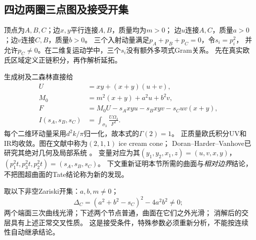 \documentclass[11pt,a4paper]{ctexart}
\theoremstyle{cnplain}\newtheorem{theorem}{定理}[section]
\theoremstyle{definition}\newtheorem{definition}[theorem]{定义}
\theoremstyle{remark}\newtheorem{remark}[theorem]{注}
\begin{document}
\subsection{四边两圈三点图及接受开集}
顶点为$A,B,C$；边$x,y$平行连接$A,B$，质量均为$m>0$；
边$u$连接$A,C$，质量$a>0$；边$v$连接$C,B$，质量$b>0$。
三个入射动量满足$p_A+p_B+p_C=0$，令$s_i=p_i^2$，
并允许$p_C\ne0$。在二维复运动学中，三个$s_i$没有额外多项式Gram关系。
先在真实欧氏区域定义正链积分，再作解析延拓。

生成树及二森林直接给
\begin{align}
 U&=xy+(x+y)(u+v),\\
 M_0&=m^2(x+y)+a^2u+b^2v,\\
 F&=M_0U-s_Axyu-s_Bxyv-s_Cuv(x+y),\\
 I(s_A,s_B,s_C)&=\int_{\sigma_3}\frac{U\Omega_3}{F^2}.
 \label{eq:injectedgraph}
\end{align}
每个二维环动量采用$d^2k/\pi$归一化，故本式的$\Gamma(2)=1$。
正质量欧氏积分UV和IR均收敛。图在文献中称为$(2,1,1)$ ice cream cone；
Doran--Harder--Vanhove已研究其绝对几何及局部系统
\cite[\S7.3, 式(120)--(121), Proposition7.6]{DHV}。
变量对应为其$(y_1,y_2,x_1,z)=(u,v,x,y)$，
$(p_1^2t,p_3^2t,p_2^2t)=(s_A,s_B,s_C)$。
下文重新证明本节所需的曲面与\emph{相对边界}结论，
不把图超曲面的Tate结论称为新的发现。

取以下非空Zariski开集：$a,b,m\ne0$；
\begin{equation}\label{eq:injecteddiscriminant}
 \Delta_C=(a^2+b^2-s_C)^2-4a^2b^2\ne0;
\end{equation}
两个端面三次曲线光滑；下述两个节点普通，曲面在它们之外光滑；
消解后的交层具有上述正常交叉性质。
这是接受条件，特殊参数必须重新分析，不能按连续性自动继承结论。
\end{document}
